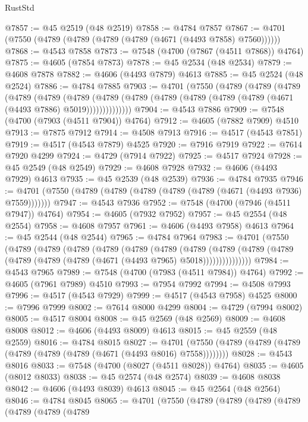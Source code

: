 \begin{lexlean}{RustStd}
\begin{coremodule}
@7857 := @45 @2519 (@48 @2519)
@7858 := @4784 @7857
@7867 := @4701 (@7550 (@4789 (@4789 (@4789 (@4789 (@4671 (@4493 @7858) @7560))))))
@7868 := @4543 @7858
@7873 := @7548 (@4700 (@7867 (@4511 @7868)) @4764)
@7875 := @4605 (@7854 @7873)
@7878 := @45 @2534 (@48 @2534)
@7879 := @4608 @7878
@7882 := @4606 (@4493 @7879) @4613
@7885 := @45 @2524 (@48 @2524)
@7886 := @4784 @7885
@7903 := @4701
    (@7550
      (@4789
        (@4789
          (@4789
            (@4789
              (@4789
                (@4789
                  (@4789 (@4789 (@4789 (@4789 (@4789 (@4789 (@4671 (@4493 @7886) @5019))))))))))))))
@7904 := @4543 @7886
@7909 := @7548 (@4700 (@7903 (@4511 @7904)) @4764)
@7912 := @4605 (@7882 @7909) @4510
@7913 := @7875 @7912
@7914 := @4508 @7913
@7916 := @4517 (@4543 @7851)
@7919 := @4517 (@4543 @7879) @4525
@7920 := @7916 @7919
@7922 := @7614 @7920 @4299
@7924 := @4729 (@7914 @7922)
@7925 := @4517 @7924
@7928 := @45 @2549 (@48 @2549)
@7929 := @4608 @7928
@7932 := @4606 (@4493 @7929) @4613
@7935 := @45 @2539 (@48 @2539)
@7936 := @4784 @7935
@7946 := @4701 (@7550 (@4789 (@4789 (@4789 (@4789 (@4789 (@4671 (@4493 @7936) @7559)))))))
@7947 := @4543 @7936
@7952 := @7548 (@4700 (@7946 (@4511 @7947)) @4764)
@7954 := @4605 (@7932 @7952)
@7957 := @45 @2554 (@48 @2554)
@7958 := @4608 @7957
@7961 := @4606 (@4493 @7958) @4613
@7964 := @45 @2544 (@48 @2544)
@7965 := @4784 @7964
@7983 := @4701
    (@7550
      (@4789
        (@4789
          (@4789
            (@4789
              (@4789
                (@4789
                  (@4789
                    (@4789
                      (@4789 (@4789 (@4789 (@4789 (@4789 (@4671 (@4493 @7965) @5018)))))))))))))))
@7984 := @4543 @7965
@7989 := @7548 (@4700 (@7983 (@4511 @7984)) @4764)
@7992 := @4605 (@7961 @7989) @4510
@7993 := @7954 @7992
@7994 := @4508 @7993
@7996 := @4517 (@4543 @7929)
@7999 := @4517 (@4543 @7958) @4525
@8000 := @7996 @7999
@8002 := @7614 @8000 @4299
@8004 := @4729 (@7994 @8002)
@8005 := @4517 @8004
@8008 := @45 @2569 (@48 @2569)
@8009 := @4608 @8008
@8012 := @4606 (@4493 @8009) @4613
@8015 := @45 @2559 (@48 @2559)
@8016 := @4784 @8015
@8027 := @4701 (@7550 (@4789 (@4789 (@4789 (@4789 (@4789 (@4789 (@4671 (@4493 @8016) @7558))))))))
@8028 := @4543 @8016
@8033 := @7548 (@4700 (@8027 (@4511 @8028)) @4764)
@8035 := @4605 (@8012 @8033)
@8038 := @45 @2574 (@48 @2574)
@8039 := @4608 @8038
@8042 := @4606 (@4493 @8039) @4613
@8045 := @45 @2564 (@48 @2564)
@8046 := @4784 @8045
@8065 := @4701
    (@7550
      (@4789
        (@4789
          (@4789
            (@4789
              (@4789
                (@4789
                  (@4789

\end{coremodule}
\end{lexlean}

